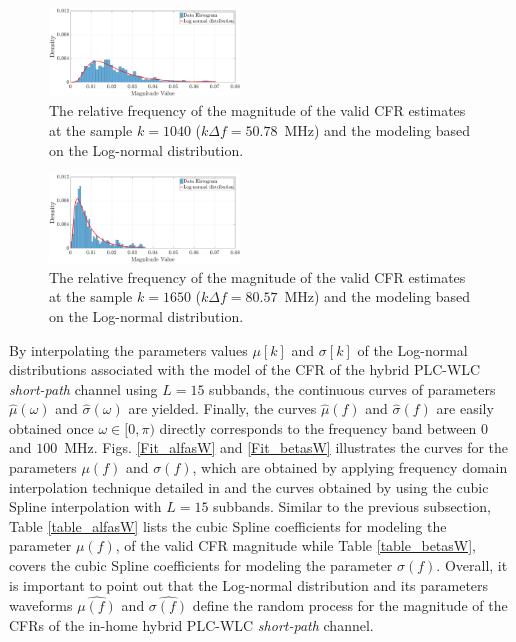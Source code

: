 \documentclass[journal]{IEEEtran}
\begin{document}
\begin{figure}[h!]
	\centering
	\includegraphics[width=0.45\textwidth]{images/Mag_histsW_2.eps}
	\caption{The relative frequency of the magnitude of the valid CFR estimates at the sample $k = 1040$ ($k\Delta f= 50.78$~MHz) and the modeling based on the Log-normal distribution.}
	\label{mag_examplesW}
\end{figure}

\begin{figure}[h!]
	\centering
	\includegraphics[width=0.45\textwidth]{images/Mag_hist2sW_2.eps}
	\caption{The relative frequency of the magnitude of the valid CFR estimates at the sample $k = 1650$ ($k\Delta f= 80.57$~MHz) and the modeling based on the Log-normal distribution.}
	\label{mag_example2sW}
\end{figure}

By interpolating the parameters values $\mu[k]$ and $\sigma[k]$ of the Log-normal distributions associated with the model of the \ac{CFR} of the hybrid \ac{PLC}-\ac{WLC} \textit{short-path} channel using $L=15$ subbands, the continuous curves of parameters $\hat{\mu}(\omega)$ and $\hat{\sigma}(\omega)$ are yielded. Finally, the curves $\hat{\mu}(f)$ and $\hat{\sigma}(f)$ are easily obtained once $\omega \in [0,\pi)$ directly corresponds to the frequency band between $0$ and $100$~MHz. Figs. \ref{Fit_alfasW} and \ref{Fit_betasW} illustrates the curves for the parameters $\mu(f)$ and $\sigma(f)$, which are obtained by applying frequency domain interpolation technique detailed in \cite{mitra} and the curves obtained by using the cubic Spline interpolation with $L=15$ subbands. Similar to the previous subsection, Table \ref{table_alfasW} lists the cubic Spline coefficients for modeling the parameter $\mu(f)$, of the valid \ac{CFR} magnitude while Table \ref{table_betasW}, covers the cubic Spline coefficients for modeling the parameter $\sigma(f)$. Overall, it is important to point out that the Log-normal distribution and its parameters waveforms $\hat{\mu(f)}$ and $\hat{\sigma(f)}$ define the random process for the magnitude of the \acp{CFR} of the in-home hybrid \ac{PLC}-\ac{WLC} \textit{short-path} channel.
\end{document}
